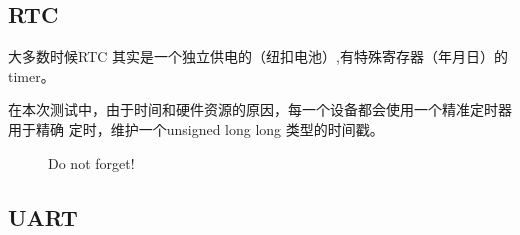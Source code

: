 \subsection{RTC}

大多数时候RTC 其实是一个独立供电的（纽扣电池）,有特殊寄存器（年月日）的 timer。

在本次测试中，由于时间和硬件资源的原因，每一个设备都会使用一个精准定时器用于精确
定时，维护一个unsigned long long 类型的时间戳。

\begin{figure}[htbp]
\caption{Do not forget!}
\end{figure}



\subsection{UART}
